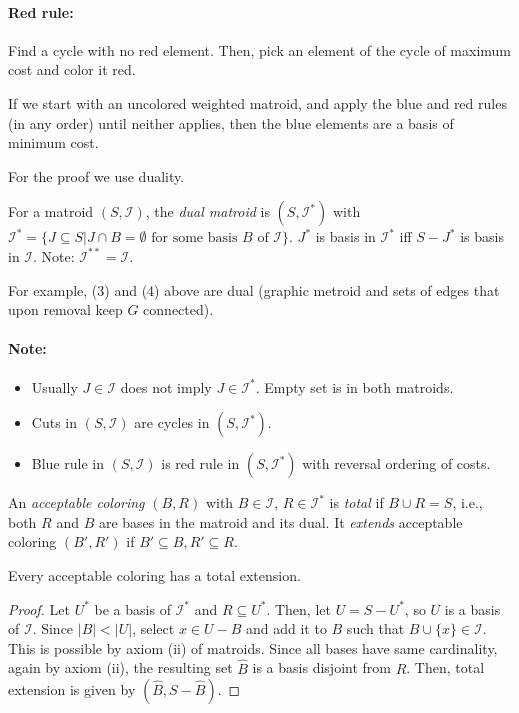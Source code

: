 \paragraph{Red rule:} Find a cycle with no red element. Then, pick an element of the cycle of maximum cost and color it red.

\begin{mytheorem}
If we start with an uncolored weighted matroid, and apply the blue and red rules (in any order) until neither applies, then the blue elements are a basis of minimum cost.
\end{mytheorem}

For the proof we use duality.

\begin{mydefinition}
For a matroid $(S, \mathcal{I})$, the \emph{dual matroid} is $(S, \mathcal{I}^*)$ with $\mathcal{I}^* = \{ J \subseteq S | J \cap B = \emptyset \text{ for some basis $B$ of $\mathcal{I}$} \}$. $J^*$ is basis in $\mathcal{I}^*$ iff $S-J^*$ is basis in $\mathcal{I}$. Note: $\mathcal{I}^{**} = \mathcal{I}$.
\end{mydefinition}

For example, (3) and (4) above are dual (graphic metroid and sets of edges that upon removal keep $G$ connected).

\paragraph{Note:}
\begin{itemize}
\item Usually $J \in \mathcal{I}$ does not imply $J \in \mathcal{I}^*$. Empty set is in both matroids. 
\item Cuts in $(S, \mathcal{I})$ are cycles in $(S, \mathcal{I}^*)$.
\item Blue rule in $(S, \mathcal{I})$ is red rule in $(S, \mathcal{I}^*)$ with reversal ordering of costs.
\end{itemize}

\begin{mydefinition}
An \emph{acceptable coloring} $(B, R)$ with $B \in \mathcal{I}$, $R \in \mathcal{I}^*$ is \emph{total} if $B \cup R = S$, i.e., both $R$ and $B$ are bases in the matroid and its dual. It \emph{extends} acceptable coloring $(B', R')$ if $B' \subseteq B, R' \subseteq R$.
\end{mydefinition}

\begin{mylemma}
Every acceptable coloring has a total extension.
\end{mylemma}
\begin{proof}
Let $U^*$ be a basis of $\mathcal{I}^*$ and $R\subseteq U^*$. Then, let $U = S - U^*$, so $U$ is a basis of $\mathcal{I}$. Since $|B| < |U|$, select $x \in U-B$ and add it to $B$ such that $B \cup \{x\} \in \mathcal{I}$. This is possible by axiom (ii) of matroids. Since all bases have same cardinality, again by axiom (ii), the resulting set $\hat{B}$ is a basis disjoint from $R$. Then, total extension is given by $(\hat{B}, S - \hat{B})$.
\end{proof}

